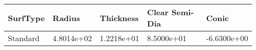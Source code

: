 \documentclass[convert={convertexe={magick.exe}}]{standalone}
\begin{document}
\begin{tabular}{lllll}
\toprule
SurfType &     Radius &  Thickness &  Clear Semi-Dia &       Conic \\
\midrule
Standard & 4.8014e+02 & 1.2218e+01 &      8.5000e+01 & -6.6300e+00 \\
\bottomrule
\end{tabular}
\end{document}
